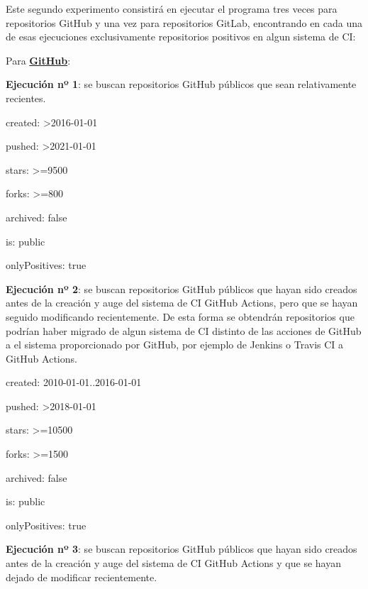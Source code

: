 Este segundo experimento consistirá en ejecutar el programa tres veces para repositorios GitHub y una vez para repositorios GitLab, encontrando en cada una de esas ejecuciones exclusivamente repositorios positivos en algun sistema de CI:
\begin{compactitem}
    \item Para \textbf{\underline{GitHub}}:
    \begin{compactitem}
        \item \textbf{Ejecución nº 1}: se buscan repositorios GitHub públicos que sean relativamente recientes.
        \begin{compactitem}
            \item created: \textgreater2016-01-01
            \item pushed: \textgreater2021-01-01
            \item stars: \textgreater=9500
            \item forks: \textgreater=800
            \item archived: false
            \item is: public
            \item onlyPositives: true
        \end{compactitem}
        \item \textbf{Ejecución nº 2}: se buscan repositorios GitHub públicos que hayan sido creados antes de la creación y auge del sistema de CI GitHub Actions, pero que se hayan seguido modificando recientemente. De esta forma se obtendrán repositorios que podrían haber migrado de algun sistema de CI distinto de las acciones de GitHub a el sistema proporcionado por GitHub, por ejemplo de Jenkins o Travis CI a GitHub Actions.
        \begin{compactitem}
            \item created: 2010-01-01..2016-01-01
            \item pushed: \textgreater2018-01-01
            \item stars: \textgreater=10500
            \item forks: \textgreater=1500
            \item archived: false
            \item is: public
            \item onlyPositives: true
        \end{compactitem}
        \item \textbf{Ejecución nº 3}: se buscan repositorios GitHub públicos que hayan sido creados antes de la creación y auge del sistema de CI GitHub Actions y que se hayan dejado de modificar recientemente.

\end{compactitem}
\end{compactitem}
